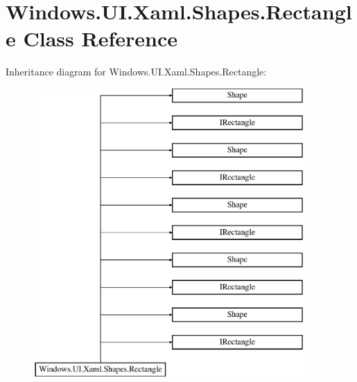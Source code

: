 \hypertarget{class_windows_1_1_u_i_1_1_xaml_1_1_shapes_1_1_rectangle}{}\section{Windows.\+U\+I.\+Xaml.\+Shapes.\+Rectangle Class Reference}
\label{class_windows_1_1_u_i_1_1_xaml_1_1_shapes_1_1_rectangle}
Inheritance diagram for Windows.\+U\+I.\+Xaml.\+Shapes.\+Rectangle\+:\begin{figure}[H]
\begin{center}
\leavevmode
\includegraphics[height=11.000000cm]{class_windows_1_1_u_i_1_1_xaml_1_1_shapes_1_1_rectangle}
\end{center}
\end{figure}
